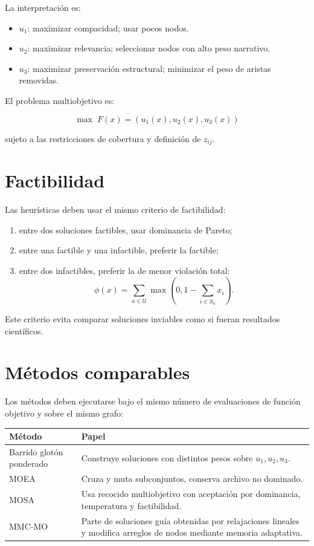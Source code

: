 \documentclass[11pt]{article}
\begin{document}
La interpretación es:

\begin{itemize}
    \item $u_1$: maximizar compacidad; usar pocos nodos.
    \item $u_2$: maximizar relevancia; seleccionar nodos con alto peso narrativo.
    \item $u_3$: maximizar preservación estructural; minimizar el peso de aristas removidas.
\end{itemize}

El problema multiobjetivo es:

\[
\max \; F(x) = (u_1(x),u_2(x),u_3(x))
\]

sujeto a las restricciones de cobertura y definición de $z_{ij}$.

\section{Factibilidad}

Las heurísticas deben usar el mismo criterio de factibilidad:

\begin{enumerate}
    \item entre dos soluciones factibles, usar dominancia de Pareto;
    \item entre una factible y una infactible, preferir la factible;
    \item entre dos infactibles, preferir la de menor violación total:
    \[
    \phi(x)=\sum_{u\in \mathcal{U}}\max\left(0,1-\sum_{i\in S_u}x_i\right).
    \]
\end{enumerate}

Este criterio evita comparar soluciones inviables como si fueran resultados científicos.

\section{Métodos comparables}

Los métodos deben ejecutarse bajo el mismo número de evaluaciones de función objetivo y sobre el mismo grafo:

\begin{center}
\begin{tabular}{p{4cm}p{9cm}}
\toprule
Método & Papel\\
\midrule
Barrido glotón ponderado & Construye soluciones con distintos pesos sobre $u_1,u_2,u_3$.\\
MOEA & Cruza y muta subconjuntos, conserva archivo no dominado.\\
MOSA & Usa recocido multiobjetivo con aceptación por dominancia, temperatura y factibilidad.\\
MMC-MO & Parte de soluciones guía obtenidas por relajaciones lineales y modifica arreglos de nodos mediante memoria adaptativa.\\
\bottomrule
\end{tabular}
\end{center}
\end{document}

